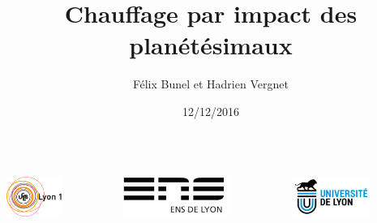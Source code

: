 \documentclass{beamer}
\title{Chauffage par impact des planétésimaux}
\author{Félix Bunel et Hadrien Vergnet}
\date{12/12/2016}
\begin{document}

\begin{frame}[plain]

\begin{columns}
\begin{column}{3.3cm}
\center
   \includegraphics[height=1.3cm]{figures/logo_lyon1.jpg}
\end{column}
\begin{column}{3.3cm}
\center
\includegraphics[height=1.3cm]{figures/logo_ens.jpg}
\end{column}
\begin{column}{3.3cm}
\center
\includegraphics[height=1.3cm]{figures/logo_univ_lyon.jpg}
\end{column}
\end{columns}

\titlepage
\end{frame}
\end{document}
